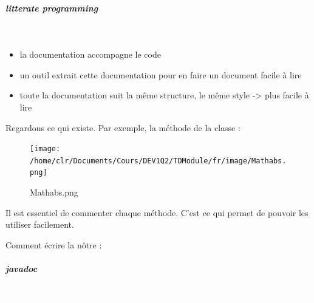 \documentclass[11pt,a4paper]{article}
\begin{document}
            \par
        
			
		\subparagraph{litterate programming} 
		
					\textcolor{white}{.} \par
				
					\begin{itemize}
				
			\item la documentation accompagne le code
			\item un outil extrait cette documentation pour en faire un document facile \`a lire
			\item toute la documentation suit la m\^eme structure, le m\^eme style -> plus facile \`a lire
					\end{itemize}
				
            \par
        
		    Regardons ce qui existe. 
		    Par exemple, la m\'ethode \verb@abs@ de la classe \verb@Math@ :
		  
            \par
        \begin{figure}[hbt]
				    \begin{center}
					\texttt{[image: /home/clr/Documents/Cours/DEV1Q2/TDModule/fr/image/Mathabs.png]}
						\end{center}
                
                    \caption[Mathabs.png]{Mathabs.png}
                \end{figure}
                    
            \par
        
		    Il est essentiel de commenter chaque m\'ethode. C'est ce qui permet de pouvoir les utiliser facilement.
		  
            \par
        
		    Comment \'ecrire la n\^otre :
		  
            \par
        
			
		\subparagraph{javadoc} 
		
					\textcolor{white}{.} \par
				
\end{document}
